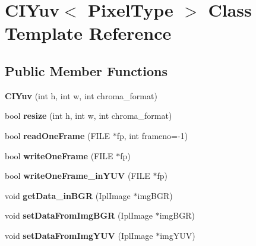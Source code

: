 \hypertarget{class_c_i_yuv}{}\section{C\+I\+Yuv$<$ Pixel\+Type $>$ Class Template Reference}
\label{class_c_i_yuv}
\subsection*{Public Member Functions}
\begin{DoxyCompactItemize}
\item 
\mbox{\label{class_c_i_yuv_ad9b362a4e5c193a9baab28248a4650c8}} 
{\bfseries C\+I\+Yuv} (int h, int w, int chroma\+\_\+format)
\item 
\mbox{\label{class_c_i_yuv_ace21b18c58d81aa3ea3f023cc6f836d4}} 
bool {\bfseries resize} (int h, int w, int chroma\+\_\+format)
\item 
\mbox{\label{class_c_i_yuv_a60101ecb1b2b4a2a8253f72d26752470}} 
bool {\bfseries read\+One\+Frame} (F\+I\+LE $\ast$fp, int frameno=-\/1)
\item 
\mbox{\label{class_c_i_yuv_a55825346f3bbc52383478dae34d297e8}} 
bool {\bfseries write\+One\+Frame} (F\+I\+LE $\ast$fp)
\item 
\mbox{\label{class_c_i_yuv_aba74ff201330fe8e94546746cc5b4b17}} 
bool {\bfseries write\+One\+Frame\+\_\+in\+Y\+UV} (F\+I\+LE $\ast$fp)
\item 
\mbox{\label{class_c_i_yuv_a3e2024626a47f3908f2ba131c654dd8f}} 
void {\bfseries get\+Data\+\_\+in\+B\+GR} (Ipl\+Image $\ast$img\+B\+GR)
\item 
\mbox{\label{class_c_i_yuv_a802e0e983d16fe91820b286cd9495e02}} 
void {\bfseries set\+Data\+From\+Img\+B\+GR} (Ipl\+Image $\ast$img\+B\+GR)
\item 
\mbox{\label{class_c_i_yuv_a8feb8b1f8312ea97a33e630134cfe957}} 
void {\bfseries set\+Data\+From\+Img\+Y\+UV} (Ipl\+Image $\ast$img\+Y\+UV)
\item 
\mbox{\label{class_c_i_yuv_a34cf870d1a2c12e9cfb0eae60064ea0d}} 

\end{DoxyCompactItemize}
